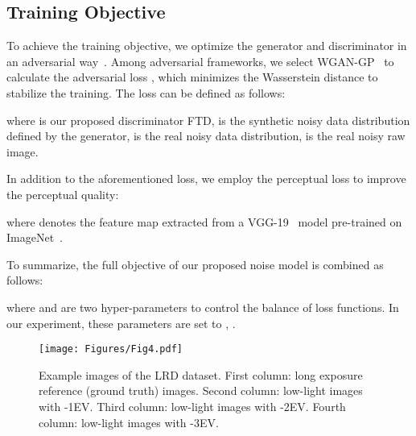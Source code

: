 \documentclass[10pt,twocolumn,letterpaper]{article}
\begin{document}
\subsection{Training Objective}
To achieve the training objective, we optimize the generator and discriminator in an adversarial way~\cite{goodfellow2020generative}. Among adversarial frameworks, we select WGAN-GP~\cite{gulrajani2017improved} to calculate the adversarial loss , which minimizes the Wasserstein distance to stabilize the training. The loss can be defined as follows:

\noindent where  is our proposed discriminator FTD,  is the synthetic noisy data distribution defined by the generator,  is the real noisy data distribution,  is the real noisy raw image.

In addition to the aforementioned  loss, we employ the perceptual loss to improve the perceptual quality:

\noindent where  denotes the feature map extracted from a VGG-19~\cite{simonyan2014very} model pre-trained on ImageNet~\cite{deng2009imagenet}.

To summarize, the full objective of our proposed noise model is combined as follows:

\noindent where  and  are two hyper-parameters to control the balance of loss functions. In our experiment, these parameters are set to , .

\begin{figure}[t]
\centering
\texttt{[image: Figures/Fig4.pdf]}
\caption{Example images of the LRD dataset. First column: long exposure reference (ground truth) images. Second column: low-light images with -1EV. Third column: low-light images with -2EV. Fourth column: low-light images with -3EV.}
\label{fig:dataset}
\vspace{-1ex}
\end{figure}
\end{document}
